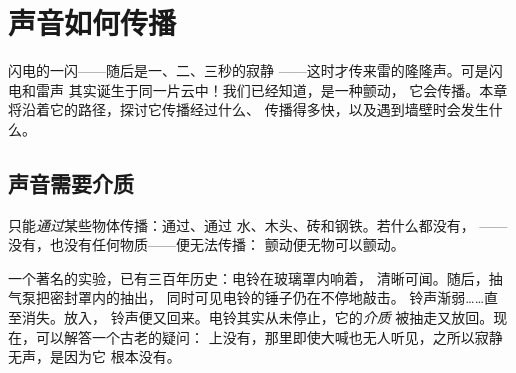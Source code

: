 \chapter{声音如何传播}\label{ch:g4:how-sound-travels}

闪电的一闪——随后是一、二、三秒的寂静
——这时才传来雷的隆隆声。可是闪电和雷声
其实诞生于同一片云中！我们已经知道，是一种颤动，
它会传播。本章将沿着它的路径，探讨它传播经过什么、
传播得多快，以及遇到墙壁时会发生什么。

\section{声音需要介质}

\begin{proposition}\label{prop:g4:how-sound-travels:carrier}
只能\emph{通过}某些物体传播：通过、通过
水、木头、砖和钢铁。若什么都没有，
——没有，也没有任何物质——便无法传播：
颤动便无物可以颤动。
\end{proposition}

\begin{example}[玻璃罩中的电铃]\label{ex:g4:how-sound-travels:jar}
一个著名的实验，已有三百年历史：电铃在玻璃罩内响着，
清晰可闻。随后，抽气泵把密封罩内的抽出，
同时可见电铃的锤子仍在不停地敲击。
铃声渐弱……直至消失。放入，
铃声便又回来。电铃其实从未停止，它的\emph{介质}
被抽走又放回。现在，可以解答一个古老的疑问：
上没有，那里即使大喊也无人听见，之所以寂静无声，是因为它
根本没有。
\end{example}

